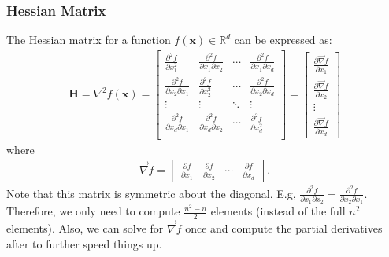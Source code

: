\documentclass[11pt, letterpaper]{extarticle} %
\begin{document}
\subsubsection{Hessian Matrix}\label{subsubsec:hessian_matrix}
The Hessian matrix for a function $f(\mathbf{x}) \in \mathbb{R}^d$ can be expressed as:
    \begin{align}
    \mathbf{H} = \nabla^2 f(\mathbf{x}) = 
    \begin{bmatrix}
    \frac{\partial^2 f}{\partial x_1^2} & \frac{\partial^2 f}{\partial x_1 \partial x_2} & \cdots & \frac{\partial^2 f}{\partial x_1 \partial x_d} \\
    \frac{\partial^2 f}{\partial x_2 \partial x_1} & \frac{\partial^2 f}{\partial x_2^2} & \cdots & \frac{\partial^2 f}{\partial x_2 \partial x_d} \\
    \vdots & \vdots & \ddots & \vdots \\
    \frac{\partial^2 f}{\partial x_d \partial x_1} & \frac{\partial^2 f}{\partial x_d \partial x_2} & \cdots & \frac{\partial^2 f}{\partial x_d^2} \\
    \end{bmatrix}
    =
    \begin{bmatrix}
    \frac{\partial \overrightarrow{\nabla}f}{\partial x_1} \\
    \frac{\partial \overrightarrow{\nabla}f}{\partial x_2} \\
    \vdots \\
    \frac{\partial \overrightarrow{\nabla}f}{\partial x_d}
    \end{bmatrix}
\end{align}
where
\begin{align}
    \overrightarrow{\nabla} f = \begin{bmatrix} \frac{\partial f}{\partial x_1} & \frac{\partial f}{\partial x_2} & \cdots & \frac{\partial f}{\partial x_d} \end{bmatrix}.
\end{align}
Note that this matrix is symmetric about the diagonal. E.g, $\frac{\partial^2 f}{\partial x_1 \partial x_2} = \frac{\partial^2 f}{\partial x_2 \partial x_1}$. Therefore, we only need to compute $\frac{n^2 - n}{2}$ elements (instead of the full $n^2$ elements). Also, we can solve for $\overrightarrow{\nabla}f$ once and compute the partial derivatives after to further speed things up.
\end{document}

